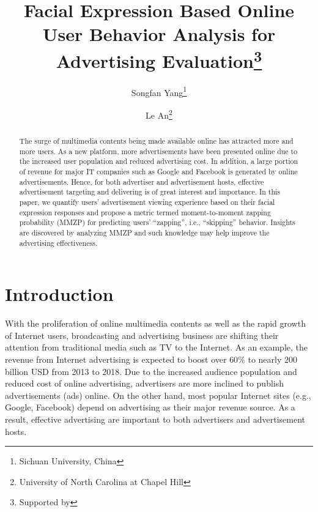 \documentclass[twoside,leqno,twocolumn]{article}
\begin{document}

\title{\Large Facial Expression Based Online User Behavior Analysis for Advertising Evaluation\thanks{Supported by }}
\author{Songfan Yang\thanks{Sichuan University, China} \\
\and
Le An\thanks{University of North Carolina at Chapel Hill}}
\date{}

\maketitle



\begin{abstract} \small\baselineskip=9pt The surge of multimedia contents being made available online has attracted more and more users. As a new platform, more advertisements have been presented online due to the increased user population and reduced advertising cost. In addition, a large portion of revenue for major IT companies such as Google and Facebook is generated by online advertisements. Hence, for both advertiser and advertisement hosts, effective advertisement targeting and delivering is of great interest and importance. In this paper, we quantify users' advertisement viewing experience based on their facial expression responses and propose a metric termed moment-to-moment zapping probability (MMZP) for predicting users' ``zapping'', i.e., ``skipping'' behavior. Insights are discovered by analyzing MMZP and such knowledge may help improve the advertising effectiveness.\end{abstract}

\section{Introduction}
With the proliferation of online multimedia contents as well as the rapid growth of Internet users, broadcasting and advertising business are shifting their attention from traditional media such as TV to the Internet. As an example, the revenue from Internet advertising is expected to boost over $60\%$ to nearly $200$ billion USD from 2013 to 2018. Due to the increased audience population and reduced cost of online advertising, advertisers are more inclined to publish advertisements (ads) online. On the other hand, most popular Internet sites (e.g., Google, Facebook) depend on advertising as their major revenue source. As a result, effective advertising are important to both advertisers and advertisement hosts.
\end{document}
